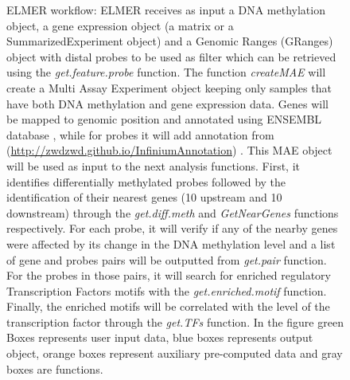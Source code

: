 \begin{figure}[!ht]
{
  }%
  
  \caption{ELMER workflow: ELMER receives as input a DNA methylation object, a gene expression object (a matrix or a SummarizedExperiment object) and a Genomic Ranges (GRanges) object with distal probes to be used as filter which can be retrieved using the \textit{get.feature.probe} function. The function \textit{createMAE}  will create a Multi Assay Experiment object keeping only samples that have both DNA methylation and gene expression data. Genes will be mapped to genomic position and annotated using ENSEMBL database \cite{doi:10.1093/database/baw093}, while for probes it will add annotation from \citeauthor{doi:10.1093/nar/gkw967} (\href{http://zwdzwd.github.io/InfiniumAnnotation}{http://zwdzwd.github.io/InfiniumAnnotation}) . This MAE object will be used as input to the next analysis functions. First, it identifies differentially methylated probes followed by the identification of their nearest genes (10 upstream and 10 downstream) through the  \textit{get.diff.meth} and  \textit{GetNearGenes} functions respectively. For each probe, it will verify if any of the nearby genes were affected by its change in the DNA methylation level and a list of  gene and probes pairs will be outputted from \textit{get.pair} function. For the probes in those pairs, it will search for enriched regulatory Transcription Factors motifs with the  \textit{get.enriched.motif} function. Finally, the  enriched motifs will be correlated with the level of the transcription factor through the \textit{get.TFs} function. In the figure green Boxes represents user input data, blue boxes represents output object, orange boxes represent auxiliary pre-computed data and gray boxes are functions.}
  \label{fig:elmerworkflow}
\end{figure}
